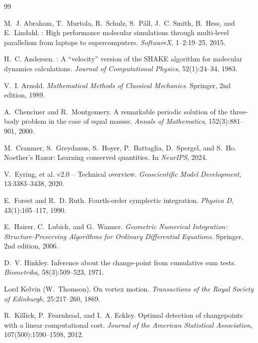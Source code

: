 \documentclass[11pt,a4paper]{article}
\begin{document}
\begin{thebibliography}{99}

M.~J. Abraham, T.~Murtola, R.~Schulz, S.~P\'all, J.~C. Smith, B.~Hess, and E.~Lindahl.
: High performance molecular simulations through multi-level parallelism from laptops to supercomputers.
\newblock \emph{SoftwareX}, 1--2:19--25, 2015.

H.~C. Andersen.
: A ``velocity'' version of the {SHAKE} algorithm for molecular dynamics calculations.
\newblock \emph{Journal of Computational Physics}, 52(1):24--34, 1983.

V.~I. Arnold.
\newblock \emph{Mathematical Methods of Classical Mechanics}.
\newblock Springer, 2nd edition, 1989.

A.~Chenciner and R.~Montgomery.
\newblock A remarkable periodic solution of the three-body problem in the case of equal masses.
\newblock \emph{Annals of Mathematics}, 152(3):881--901, 2000.

M.~Cranmer, S.~Greydanus, S.~Hoyer, P.~Battaglia, D.~Spergel, and S.~Ho.
\newblock Noether's Razor: Learning conserved quantities.
\newblock In \emph{NeurIPS}, 2024.

V.~Eyring, et al.
 v2.0 -- Technical overview.
\newblock \emph{Geoscientific Model Development}, 13:3383--3438, 2020.

E.~Forest and R.~D. Ruth.
\newblock Fourth-order symplectic integration.
\newblock \emph{Physica D}, 43(1):105--117, 1990.

E.~Hairer, C.~Lubich, and G.~Wanner.
\newblock \emph{Geometric Numerical Integration: Structure-Preserving Algorithms for Ordinary Differential Equations}.
\newblock Springer, 2nd edition, 2006.

D.~V. Hinkley.
\newblock Inference about the change-point from cumulative sum tests.
\newblock \emph{Biometrika}, 58(3):509--523, 1971.

Lord Kelvin (W.~Thomson).
\newblock On vortex motion.
\newblock \emph{Transactions of the Royal Society of Edinburgh}, 25:217--260, 1869.

R.~Killick, P.~Fearnhead, and I.~A. Eckley.
\newblock Optimal detection of changepoints with a linear computational cost.
\newblock \emph{Journal of the American Statistical Association}, 107(500):1590--1598, 2012.


\end{thebibliography}
\end{document}
